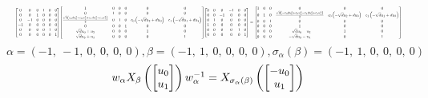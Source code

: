 \documentclass[11pt]{article}
\theoremstyle{definition}
\begin{document}
\[
\scaletoalign{\textwidth}{{\left[\begin{matrix}0 & 0 & 0 & 1 & 0 & 0\\0 & 0 & 1 & 0 & 0 & 0\\0 & -1 & 0 & 0 & 0 & 0\\-1 & 0 & 0 & 0 & 0 & 0\\0 & 0 & 0 & 0 & 1 & 0\\0 & 0 & 0 & 0 & 0 & 1\end{matrix}\right]} {\left[\begin{matrix}1 & 0 & 0 & 0 & 0 & 0\\0 & 1 & 0 & 0 & 0 & 0\\\frac{\sqrt{d} \left(c_{0} d u_{0}^{2} - c_{0} u_{2}^{2} + c_{1} d u_{3}^{2} - c_{1} u_{1}^{2}\right)}{2} & 0 & 1 & 0 & c_{0} \left(- \sqrt{d} u_{2} + d u_{0}\right) & c_{1} \left(- \sqrt{d} u_{1} + d u_{3}\right)\\0 & 0 & 0 & 1 & 0 & 0\\\sqrt{d} u_{0} + u_{2} & 0 & 0 & 0 & 1 & 0\\\sqrt{d} u_{3} + u_{1} & 0 & 0 & 0 & 0 & 1\end{matrix}\right]} {\left[\begin{matrix}0 & 0 & 0 & -1 & 0 & 0\\0 & 0 & -1 & 0 & 0 & 0\\0 & 1 & 0 & 0 & 0 & 0\\1 & 0 & 0 & 0 & 0 & 0\\0 & 0 & 0 & 0 & 1 & 0\\0 & 0 & 0 & 0 & 0 & 1\end{matrix}\right]} = {\left[\begin{matrix}1 & 0 & 0 & 0 & 0 & 0\\0 & 1 & 0 & \frac{\sqrt{d} \left(- c_{0} d u_{0}^{2} + c_{0} u_{2}^{2} - c_{1} d u_{3}^{2} + c_{1} u_{1}^{2}\right)}{2} & c_{0} \left(- \sqrt{d} u_{2} + d u_{0}\right) & c_{1} \left(- \sqrt{d} u_{1} + d u_{3}\right)\\0 & 0 & 1 & 0 & 0 & 0\\0 & 0 & 0 & 1 & 0 & 0\\0 & 0 & 0 & - \sqrt{d} u_{0} - u_{2} & 1 & 0\\0 & 0 & 0 & - \sqrt{d} u_{3} - u_{1} & 0 & 1\end{matrix}\right]}}
\]
\[
\alpha = \left( -1, \  -1, \  0, \  0, \  0, \  0\right), \beta = \left( -1, \  1, \  0, \  0, \  0, \  0\right), \sigma_{\alpha}(\beta) = \left( -1, \  1, \  0, \  0, \  0, \  0\right)
\]
\[
\scaletoalign{\textwidth}{w_{\alpha} X_{\beta}\left(\left[\begin{matrix}u_{0}\\u_{1}\end{matrix}\right]\right) w_{\alpha}^{-1} = X_{\sigma_{\alpha}\left(\beta\right)}\left(\left[\begin{matrix}- u_{0}\\u_{1}\end{matrix}\right]\right)}
\]
\end{document}
